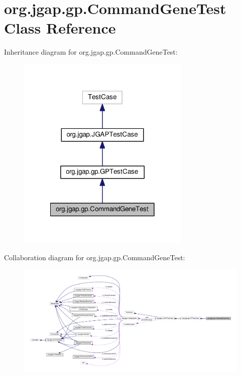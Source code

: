 \hypertarget{classorg_1_1jgap_1_1gp_1_1_command_gene_test}{\section{org.\-jgap.\-gp.\-Command\-Gene\-Test Class Reference}
\label{classorg_1_1jgap_1_1gp_1_1_command_gene_test}
}


Inheritance diagram for org.\-jgap.\-gp.\-Command\-Gene\-Test\-:
\nopagebreak
\begin{figure}[H]
\begin{center}
\leavevmode
\includegraphics[width=234pt]{classorg_1_1jgap_1_1gp_1_1_command_gene_test__inherit__graph}
\end{center}
\end{figure}


Collaboration diagram for org.\-jgap.\-gp.\-Command\-Gene\-Test\-:
\nopagebreak
\begin{figure}[H]
\begin{center}
\leavevmode
\includegraphics[width=350pt]{classorg_1_1jgap_1_1gp_1_1_command_gene_test__coll__graph}
\end{center}
\end{figure}
